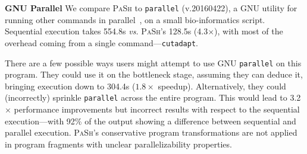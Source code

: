 \documentclass[sigplan, review, screen, anonymous]{acmart}
\newcommand{\vs}{{\em vs.} }
\newcommand{\heading}[1]{\vspace{4pt}\noindent\textbf{#1}\enspace}
\newcommand{\ttt}[1]{\texttt{#1}}
\newcommand{\kk}[1]{[{\color{magenta}kk: #1}]}
\newcommand{\sys}{{\scshape PaSh}\xspace}
\begin{document}

\heading{GNU Parallel}
We compare \sys to \ttt{parallel} (v.20160422), a GNU utility for running other commands in parallel~\cite{Tange2011a}, on a small bio-informatics script.
Sequential execution takes 554.8s \vs \sys's 128.5s (4.3$\times$), with most of the overhead coming from a single command---\ttt{cutadapt}.


There are a few possible ways users might attempt to use GNU \ttt{parallel} on this program.
They could use it on the bottleneck stage, assuming they can deduce it, bringing execution down to 304.4s ($1.8\times$ speedup).
Alternatively, they could (incorrectly) sprinkle \ttt{parallel} across the entire program.
This would lead to 3.2$\times$ performance improvements but incorrect results with respect to the sequential execution---with 92\% of the output showing a difference between sequential and parallel execution.
\sys's conservative program transformations are not applied in program fragments with unclear parallelizability properties.


\end{document}
